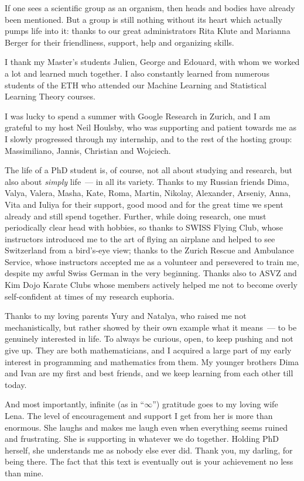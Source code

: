 If one sees a scientific group as an organism, then heads and bodies have
already been mentioned. But a group is still nothing without its heart which
actually pumps life into it: thanks to our great administrators Rita Klute and
Marianna Berger for their friendliness, support, help and organizing skills.

I thank my Master's students Julien, George and Edouard, with whom we worked a
lot and learned much together. I also constantly learned from numerous
students of the ETH who attended our Machine Learning and Statistical Learning
Theory courses.

I was lucky to spend a summer with Google Research in Zurich, and I am
grateful to my host Neil Houlsby, who was supporting and patient towards me as I
slowly progressed through my internship, and to the rest of the hosting group:
Massimiliano, Jannis, Christian and Wojciech.

The life of a PhD student is, of course, not all about studying and research,
but also about \textit{simply} life~--- in all its variety. Thanks to my Russian
friends Dima, Valya, Valera, Masha, Kate, Roma, Martin, Nikolay, Alexander,
Arseniy, Anna, Vita and Iuliya for their support, good mood and for the great
time we spent already and still spend together. Further, while doing research,
one must periodically clear head with hobbies, so thanks to SWISS Flying Club,
whose instructors introduced me to the art of flying an airplane and helped to
see Switzerland from a bird's-eye view; thanks to the Zurich Rescue and
Ambulance Service, whose instructors accepted me as a volunteer and persevered
to train me, despite my awful Swiss German in the very beginning. Thanks also to
ASVZ and Kim Dojo Karate Clubs whose members actively helped me not to become
overly self-confident at times of my research euphoria.

Thanks to my loving parents Yury and Natalya, who raised me not mechanistically,
but rather showed by their own example what it means~--- to be genuinely
interested in life. To always be curious, open, to keep pushing and not give up.
They are both mathematicians, and I acquired a large part of my early interest
in programming and mathematics from them. My younger brothers Dima and Ivan are
my first and best friends, and we keep learning from each other till today.

And most importantly, infinite (as in ``$\infty$'') gratitude goes to my loving
wife Lena. The level of encouragement and support I get from her is more than
enormous. She laughs and makes me laugh even when everything seems ruined and
frustrating. She is supporting in whatever we do together. Holding PhD herself,
she understands me as nobody else ever did. Thank you, my darling, for being
there. The fact that this text is eventually out is your achievement no less
than mine. 

